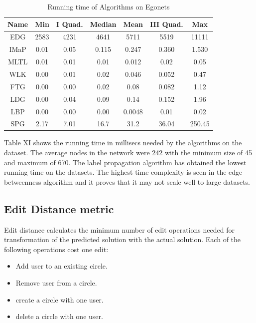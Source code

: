 \begin{table}[!h]
\renewcommand{\arraystretch}{1.3}
\caption{Running time of Algorithms on Egonets}
\label{table}
\centering
\begin{tabular}{|c|c|c|c|c|c|c|}
  \hline
\multicolumn{1}{|c|}{\textbf{Name}} & \multicolumn{1}{|c|}{\textbf{Min}} & \multicolumn{1}{c|}{\textbf{I Quad.}} & \multicolumn{1}{c|}{\textbf{Median}} & \multicolumn{1}{c|}{\textbf{Mean}} & \multicolumn{1}{c|}{\textbf{III Quad.}} & \multicolumn{1}{c|}{\textbf{Max}}        \\
  \hline
  EDG & 2583 & 4231 & 4641 & 5711 & 5519 & 11111\\
  \hline
  IMaP & 0.01 & 0.05 & 0.115 & 0.247 & 0.360 & 1.530\\
  \hline
  MLTL & 0.01 & 0.01 & 0.01 & 0.012 & 0.02 & 0.05\\
  \hline
  WLK & 0.00 & 0.01 & 0.02 & 0.046 & 0.052 & 0.47\\
  \hline
  FTG & 0.00 & 0.00 & 0.02 & 0.08 & 0.082 & 1.12\\
  \hline
  LDG & 0.00 & 0.04 & 0.09 & 0.14 & 0.152 & 1.96\\
  \hline
  LBP & 0.00 & 0.00 & 0.00 & 0.0048 & 0.01 & 0.02\\
  \hline
  SPG & 2.17 & 7.01 & 16.7 & 31.2 & 36.04 & 250.45\\
  
   \hline
\end{tabular}
\end{table}

Table XI shows the running time in millisecs needed by the algorithms on the dataset. The average nodes in the network were 242 with the minimum size of 45 and maximum of 670. The label propagation algorithm has obtained the lowest running time on the datasets. The highest time complexity is seen in the edge betweenness algorithm and it proves that it may not scale well to large datasets.

\subsection{Edit Distance metric}

Edit distance calculates the minimum number of edit operations needed for transformation of the predicted solution with the actual solution. Each of the following operations cost one edit: 
\begin{itemize}
\item Add user to an existing circle.
\item Remove user from a circle.
\item create a circle with one user.
\item delete a circle with one user.
\end{itemize}


